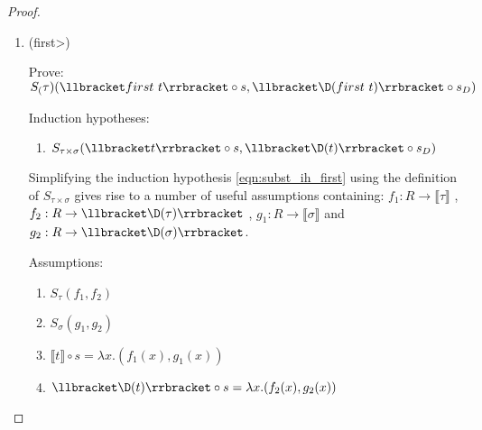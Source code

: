 \begin{proof}
\begin{enumerate}
\begin{align*}
        & \Vdash \text{(Give witnesses of $S_\tau$ and $S_\sigma$ using respective IHs \ref{eqn:subst_ih_tuple1} and \ref{eqn:subst_ih_tuple2})} \\
        & \;\;\;\;\lambda x. (\llbracket t_1 \rrbracket(s(x)), \llbracket t_2 \rrbracket(s(x))) \\
        & \;\;\;\;\;\;\; = \lambda x. (\llbracket t_1 \rrbracket(s(x)), \llbracket t_2 \rrbracket(s(x))) \wedge \\
        & \;\;\;\;\lambda x. (\llbracket \D(t_1) \rrbracket(s'(x)), \llbracket \D(t_2) \rrbracket(s'(x))) \\
        & \;\;\;\;\;\;\; = \lambda x. (\llbracket \D(t_1) \rrbracket(s'(x)), \llbracket \D(t_2) \rrbracket(s'(x))) \\
        & \Vdash \text{(Reflexivity)} \\
      \end{align*}\qed
      \item (\<first>)

      Prove: $S_(\tau)(\llbracket first\ t \rrbracket \circ s, \llbracket \D(first\ t) \rrbracket \circ s_D)$

      Induction hypotheses:
      \begin{enumerate}
        \item \label{eqn:subst_ih_first}$S_{\tau\times\sigma}(\llbracket t \rrbracket \circ s, \llbracket \D(t) \rrbracket \circ s_D)$
      \end{enumerate}

      Simplifying the induction hypothesis \ref{eqn:subst_ih_first} using the definition of $S_{\tau\times\sigma}$ gives rise to a number of useful assumptions containing:
      $f_1 : R \rightarrow \llbracket \tau \rrbracket$
      , $f_2 : R \rightarrow \llbracket \D(\tau) \rrbracket$
      , $g_1 : R \rightarrow \llbracket \sigma \rrbracket$
      and $g_2 : R \rightarrow \llbracket \D(\sigma) \rrbracket$.

      Assumptions:
      \begin{enumerate}
        \item \label{eqn:subst_ass_proj1_4} $S_\tau(f_1, f_2)$
        \item \label{eqn:subst_ass_proj1_5} $S_\sigma(g_1, g_2)$
        \item \label{eqn:subst_ass_proj1_6} $\llbracket t \rrbracket \circ s = \lambda x. (f_1(x), g_1(x))$
        \item \label{eqn:subst_ass_proj1_7} $\llbracket \D(t) \rrbracket \circ s = \lambda x. (f_2(x), g_2(x))$
      \end{enumerate}


\end{enumerate}
\end{proof}
